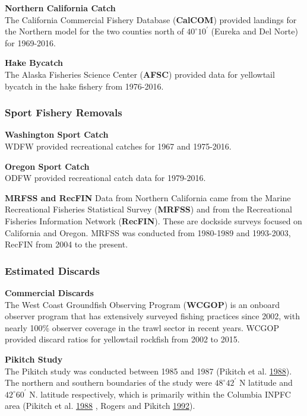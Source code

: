 \documentclass[12pt,]{article}
\begin{document}
\textbf{Northern California Catch}\\
The California Commercial Fishery Database (\textbf{CalCOM}) provided
landings for the Northern model for the two counties north of
\(40^\circ 10^\prime\) (Eureka and Del Norte) for 1969-2016.

\textbf{Hake Bycatch}\\
The Alaska Fisheries Science Center (\textbf{AFSC}) provided data for
yellowtail bycatch in the hake fishery from 1976-2016.

\subsubsection{Sport Fishery Removals}\label{sport-fishery-removals}

\textbf{Washington Sport Catch}\\
WDFW provided recreational catches for 1967 and 1975-2016.

\textbf{Oregon Sport Catch}\\
ODFW provided recreational catch data for 1979-2016.

\textbf{MRFSS and RecFIN} Data from Northern California came from the
Marine Recreational Fisheries Statistical Survey (\textbf{MRFSS}) and
from the Recreational Fisheries Information Network (\textbf{RecFIN}).
These are dockside surveys focused on California and Oregon. MRFSS was
conducted from 1980-1989 and 1993-2003, RecFIN from 2004 to the present.

\subsubsection{Estimated Discards}\label{estimated-discards}

\textbf{Commercial Discards}\\
The West Coast Groundfish Observing Program (\textbf{WCGOP}) is an
onboard observer program that has extensively surveyed fishing practices
since 2002, with nearly 100\% observer coverage in the trawl sector in
recent years. WCGOP provided discard ratios for yellowtail rockfish from
2002 to 2015.

\textbf{Pikitch Study}\\
The Pikitch study was conducted between 1985 and 1987 (Pikitch et al.
\protect\hyperlink{ref-Pikitch1988}{1988}). The northern and southern
boundaries of the study were \(48^\circ 42^\prime\) N latitude and
\(42^\circ 60^\prime\) N. latitude respectively, which is primarily
within the Columbia INPFC area (Pikitch et al.
\protect\hyperlink{ref-Pikitch1988}{1988} , Rogers and Pikitch
\protect\hyperlink{ref-Rogers1992}{1992}).
\end{document}
